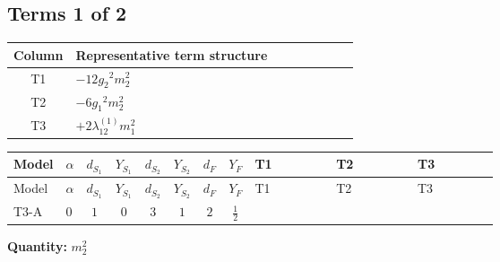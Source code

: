 \documentclass[8pt]{article}
\begin{document}
\begin{landscape}
\subsection*{Terms 1 of 2}
\begin{center}
\begin{tabular}{@{}c >{\raggedright\arraybackslash}p{0.82\linewidth}@{}}
\toprule
Column & Representative term structure \\
\midrule
T1 & \(\displaystyle -12 {g_2}^2 {m_2^2}\) \\
\midrule
T2 & \(\displaystyle -6 {g_1}^2 {m_2^2}\) \\
\midrule
T3 & \(\displaystyle +2 {\lambda_{12}^{(1)}} {m_1^2}\) \\
\midrule
\bottomrule
\end{tabular}
\end{center}
\smallskip
\tiny
\begin{longtable}{@{}llcccccc >{\raggedright\arraybackslash}p{0.21\linewidth} >{\raggedright\arraybackslash}p{0.21\linewidth} >{\raggedright\arraybackslash}p{0.21\linewidth}@{}}
\toprule
Model & $\alpha$ & $d_{S_1}$ & $Y_{S_1}$ & $d_{S_2}$ & $Y_{S_2}$ & $d_F$ & $Y_F$ & T1 & T2 & T3 \\
\midrule
\endfirsthead
\toprule
Model & $\alpha$ & $d_{S_1}$ & $Y_{S_1}$ & $d_{S_2}$ & $Y_{S_2}$ & $d_F$ & $Y_F$ & T1 & T2 & T3 \\
\midrule
\endhead
T3-A & $0$ & $1$ & $0$ & $3$ & $1$ & $2$ & $\frac{1}{2}$ & \scriptsize\adjustbox{max width=\linewidth}{$\begin{gathered} -12 {g_2}^2 {m_2^2}\end{gathered}$} & \scriptsize\adjustbox{max width=\linewidth}{$\begin{gathered} -6 {g_1}^2 {m_2^2}\end{gathered}$} & \scriptsize\adjustbox{max width=\linewidth}{$\begin{gathered} +2 {\lambda_{12}^{(1)}} {m_1^2}\end{gathered}$} \\
\midrule
\bottomrule
\end{longtable}
\clearpage
\noindent\textbf{Quantity: }$m_2^2$\par\smallskip

\end{landscape}
\end{document}
